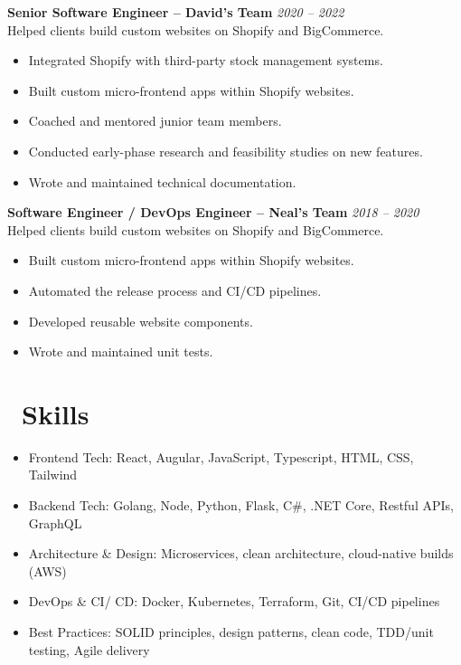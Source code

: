 \documentclass{resume}
\begin{document}
\vspace{1em}

\vspace{1em}
\textbf{Senior Software Engineer – David's Team} \hfill \textit{2020 -- 2022} \\
Helped clients build custom websites on Shopify and BigCommerce.
\begin{itemize}
  \item Integrated Shopify with third-party stock management systems.
  \item Built custom micro-frontend apps within Shopify websites.
  \item Coached and mentored junior team members.
  \item Conducted early-phase research and feasibility studies on new features.
  \item Wrote and maintained technical documentation.
\end{itemize}

\vspace{1em}

\textbf{Software Engineer / DevOps Engineer – Neal's Team} \hfill \textit{2018 -- 2020} \\
Helped clients build custom websites on Shopify and BigCommerce.
\begin{itemize}
  \item Built custom micro-frontend apps within Shopify websites.
  \item Automated the release process and CI/CD pipelines.
  \item Developed reusable website components.
  \item Wrote and maintained unit tests.
\end{itemize}


\section{\faCogs\ Skills}
\begin{itemize}[parsep=0.5ex]
  \item Frontend Tech: React, Augular, JavaScript, Typescript, HTML, CSS, Tailwind
  \item Backend Tech: Golang, Node, Python, Flask, C\#, .NET Core, Restful APIs, GraphQL
  \item Architecture \& Design: Microservices, clean architecture, cloud-native builds (AWS)
  \item DevOps \& CI/ CD: Docker, Kubernetes, Terraform, Git, CI/CD pipelines
  \item Best Practices: SOLID principles, design patterns, clean code, TDD/unit testing, Agile delivery
\end{itemize}
\end{document}
